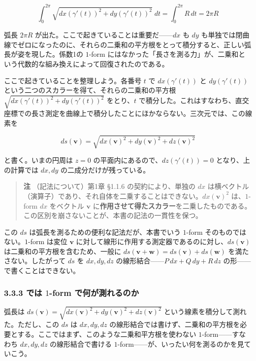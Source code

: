 \documentclass[a4paper,12pt,openany]{book}
\begin{document}
\[\int_0^{2\pi} \!\sqrt{dx(\gamma'(t))^2 + dy(\gamma'(t))^2}\;dt = \int_0^{2\pi} \!R\,dt = 2\pi R\]

弧長 \(2\pi R\) が出た。ここで起きていることは重要だ——\(dx\) も
\(dy\)
も単独では閉曲線でゼロになったのに、それらの二乗和の平方根をとって積分すると、正しい弧長が姿を現した。係数1の
\(1\)-form
にはなかった「長さを測る力」が、二乗和という代数的な組み換えによって回復されたのである。

ここで起きていることを整理しよう。各番号 \(t\) で \(dx(\gamma'(t))\) と
\(dy(\gamma'(t))\) という二つのスカラーを得て、それらの二乗和の平方根
\(\sqrt{dx(\gamma'(t))^2 + dy(\gamma'(t))^2}\) をとり、\(t\)
で積分した。これはすなわち、直交座標での長さ測定を曲線上で積分したことにほかならない。三次元では、この線素を

\[ds(\mathbf{v}) = \sqrt{dx(\mathbf{v})^2 + dy(\mathbf{v})^2 + dz(\mathbf{v})^2}\]

と書く。いまの円周は \(z=0\) の平面内にあるので、\(dz(\gamma'(t))=0\)
となり、上の計算では \(dx,dy\) の二成分だけが残っている。

\begin{quote}
\textbf{注} （記法について）第1章 §1.1.6 の契約により、単独の \(dx\)
は横ベクトル（演算子）であり、それ自体を二乗することはできない。\(dx(\mathbf{v})^2\)
は、\(1\)-form \(dx\) をベクトル \(\mathbf{v}\)
に\textbf{作用させて得たスカラー}を二乗したものである。この区別を崩さないことが、本書の記法の一貫性を保つ。
\end{quote}

この \(ds\) は弧長を測るための便利な記法だが、本書でいう \(1\)-form
そのものではない。\(1\)-form は変位 \(\mathbf{v}\)
に対して線形に作用する測定器であるのに対し、\(ds(\mathbf{v})\)
は二乗和の平方根を含むため、一般に
\(ds(\mathbf{v}+\mathbf{w}) = ds(\mathbf{v})+ds(\mathbf{w})\)
を満たさない。したがって \(ds\) を \(dx,dy,dz\)
の線形結合——\(P\,dx+Q\,dy+R\,dz\) の形——で書くことはできない。

\hypertarget{ux3067ux306f-1-form-ux3067ux4f55ux304cux6e2cux308cux308bux306eux304b}{%
\subsubsection{\texorpdfstring{3.3.3 では \(1\)-form
で何が測れるのか}{3.3.3 では 1-form で何が測れるのか}}\label{ux3067ux306f-1-form-ux3067ux4f55ux304cux6e2cux308cux308bux306eux304b}}

弧長は
\(ds(\mathbf{v}) = \sqrt{dx(\mathbf{v})^2 + dy(\mathbf{v})^2 + dz(\mathbf{v})^2}\)
という線素を積分して測れた。ただし、この \(ds\) は \(dx,dy,dz\)
の線形結合では書けず、二乗和の平方根を必要とする。ここではまず、このような二乗和平方根を使わない
\(1\)-form——すなわち \(dx, dy, dz\) の線形結合で書ける
\(1\)-form——が、いったい何を測るのかを見ていこう。
\end{document}
